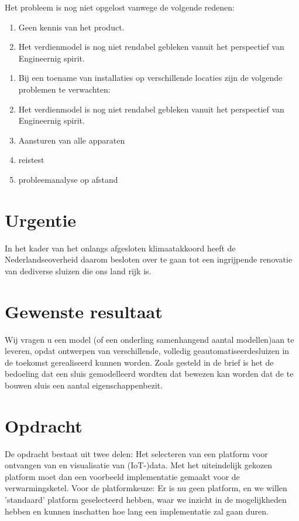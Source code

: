 Het probleem is nog niet opgelost vanwege de volgende redenen:
\begin{enumerate}
	\item Geen kennis van het product. 
	\item Het verdienmodel is nog  niet rendabel gebleken vanuit het perspectief van Engineernig spirit. 
\end{enumerate}

\begin{enumerate}
	\item Bij een toename van installaties op verschillende locaties zijn de volgende problemen te verwachten:
	\item Het verdienmodel is nog  niet rendabel gebleken vanuit het perspectief van Engineernig spirit. 
	\item  Aansturen van alle apparaten
	\item reistest
	\item probleemanalyse op afstand
\end{enumerate}

\section{Urgentie}
In  het  kader  van  het  onlangs  afgesloten  klimaatakkoord  heeft  de  Nederlandseoverheid  daarom  besloten  over  te  gaan  tot  een  ingrijpende  renovatie  van  dediverse  sluizen  die  ons  land  rijk  is.    


\section{Gewenste resultaat}
			Wij vragen u een model (of een onderling samenhangend aantal modellen)aan  te  leveren,  opdat  ontwerpen  van  verschillende,  volledig  geautomatiseerdesluizen in de toekomst gerealiseerd kunnen worden. 
Zoals  gesteld  in  de  brief  is  het  de  bedoeling  dat  een  sluis  gemodelleerd  wordten  dat  bewezen  kan  worden  dat  de  te  bouwen  sluis  een  aantal  eigenschappenbezit.  

 

\section{Opdracht}


De opdracht bestaat uit twee delen: Het selecteren van een platform voor ontvangen van en visualisatie van (IoT-)data.	Met het uiteindelijk gekozen platform moet dan een voorbeeld implementatie gemaakt voor de verwarmingsketel.
Voor de platformkeuze: Er is nu geen platform, en we willen 'standaard' platform geselecteerd hebben, waar we inzicht in de mogelijkheden hebben en kunnen inschatten hoe lang een implementatie zal gaan duren.

